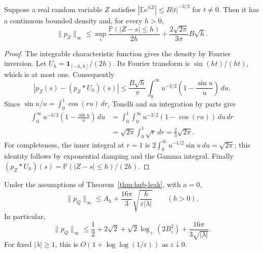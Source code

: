 \begin{lemma}\label{lem:hub-window-recovery}
Suppose a real random variable $Z$ satisfies
$|\mathbb E e^{itZ}|\le B|t|^{-3/2}$ for $t\ne0$.
Then it has a continuous bounded density and, for every $h>0$,
\begin{equation}\label{eq:hub-window-recovery}
 \|p_Z\|_\infty\le
 \sup_s\frac{\mathbb P(|Z-s|\le h)}{2h}
       +\frac{2\sqrt{2\pi}}{3\pi}B\sqrt h.
\end{equation}
\end{lemma}

\begin{proof}
The integrable characteristic function gives the density by Fourier
inversion.  Let $U_h=\mathbf1_{[-h,h]}/(2h)$.
Its Fourier transform is $\sin(ht)/(ht)$, which is at most one.
Consequently
\[
 |p_Z(s)-(p_Z*U_h)(s)|
 \le\frac{B\sqrt h}{\pi}
   \int_0^\infty u^{-3/2}\left(1-\frac{\sin u}{u}\right)\,du.
\]
Since $\sin u/u=\int_0^1\cos(ru)\,dr$, Tonelli and an integration by
parts give
\begin{align*}
 \int_0^\infty u^{-3/2}\left(1-\frac{\sin u}{u}\right)\,du
 &=\int_0^1\int_0^\infty u^{-3/2}(1-\cos(ru))\,du\,dr\\
 &=\sqrt{2\pi}\int_0^1\sqrt r\,dr
 =\frac23\sqrt{2\pi}.
\end{align*}
For completeness, the inner integral at $r=1$ is
$2\int_0^\infty u^{-1/2}\sin u\,du=\sqrt{2\pi}$;
this identity follows by exponential damping and the Gamma integral.
Finally $(p_Z*U_h)(s)=\mathbb P(|Z-s|\le h)/(2h)$.
\end{proof}

\begin{corollary}
\label{cor:hub-loglog-density}
Under the assumptions of Theorem~\ref{thm:hub-leak}, with $a=0$,
\begin{equation}\label{eq:hub-loglog-recovery}
 \|p_Q\|_\infty\le A_h+
       \frac{16\pi}{3}\sqrt{\frac{h}{\varepsilon|\lambda|}}
       \qquad(h>0).
\end{equation}
In particular,
\begin{equation}\label{eq:hub-loglog-density}
 \|p_Q\|_\infty\le\frac12+2\sqrt2+
       \sqrt2\log_+(2B_\varepsilon^2)
                +\frac{16\pi}{3\sqrt{|\lambda|}}.
\end{equation}
For fixed $|\lambda|\ge1$, this is
$O(1+\log\log(1/\varepsilon))$ as $\varepsilon\downarrow0$.
\end{corollary}

